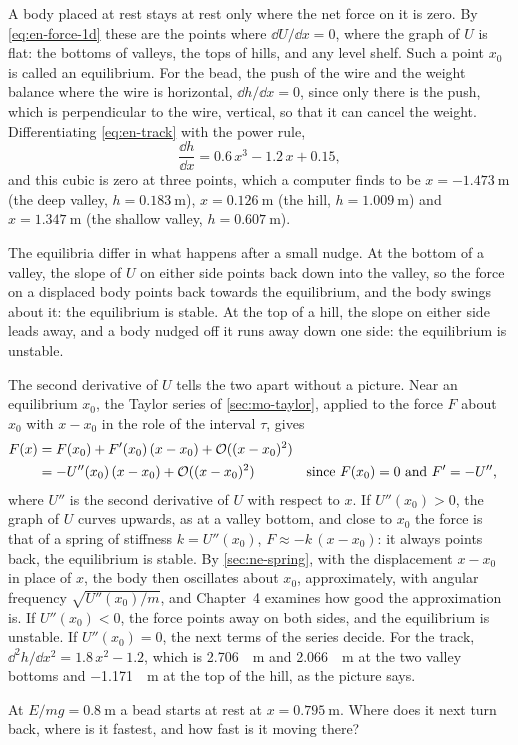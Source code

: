 A body placed at rest stays at rest only where the net force on it is
zero. By
\cref{eq:en-force-1d} these are the points where $\dd U/\dd x = 0$, where
the graph of $U$ is flat: the bottoms of valleys, the tops of hills, and
any level shelf. Such a point $x_0$ is called an equilibrium. For the
bead, the push of the wire and the weight balance where the wire is
horizontal, $\dd h/\dd x = 0$, since only there is the push, which is
perpendicular to the wire, vertical, so that it can cancel the weight. Differentiating \cref{eq:en-track} with the
power rule,
\begin{equation*}
   \frac{\dd h}{\dd x} = 0.6\,x^3 - 1.2\,x + 0.15 ,
\end{equation*}
and this cubic is zero at three points, which a computer finds to be $x =
\SI{-1.473}{\metre}$ (the deep valley, $h = \SI{0.183}{\metre}$), $x =
\SI{0.126}{\metre}$ (the hill, $h = \SI{1.009}{\metre}$) and $x =
\SI{1.347}{\metre}$ (the shallow valley, $h = \SI{0.607}{\metre}$).

The equilibria differ in what happens after a small nudge. At the bottom
of a valley, the slope of $U$ on either side points back down into the
valley, so the force on a displaced body points back towards the
equilibrium, and the body swings about it: the equilibrium is stable. At
the top of a hill, the slope on either side leads away, and a body nudged
off it runs away down one side: the equilibrium is unstable.

The second derivative of $U$ tells the two apart without a picture. Near
an equilibrium $x_0$, the Taylor series of \cref{sec:mo-taylor}, applied
to the force $F$ about $x_0$ with $x - x_0$ in the role of the interval
$\tau$, gives
\begin{align*}
   F(x) &= F(x_0) + F'(x_0)\,(x - x_0) + \mathcal{O}((x - x_0)^2)\\
   &= -U''(x_0)\,(x - x_0) + \mathcal{O}((x - x_0)^2)
      && \text{since $F(x_0) = 0$ and $F' = -U''$,}
\end{align*}
where $U''$ is the second derivative of $U$ with respect to $x$. If
$U''(x_0) > 0$, the graph of $U$ curves upwards, as at a valley bottom,
and close to $x_0$ the force is that of a spring of stiffness $k =
U''(x_0)$, $F \approx -k\,(x - x_0)$: it always points back, the
equilibrium is stable. By \cref{sec:ne-spring}, with the displacement
$x - x_0$ in place of $x$, the body then oscillates about $x_0$,
approximately, with angular frequency $\sqrt{U''(x_0)/m}$,
and Chapter~4 examines how good the approximation is. If $U''(x_0) <
0$, the force points away on both sides, and the equilibrium is unstable.
If $U''(x_0) = 0$, the next terms of the series decide. For the track,
$\dd^2 h/\dd x^2 = 1.8\,x^2 - 1.2$, which is \SI{+2.706}{\per\metre} and
\SI{+2.066}{\per\metre} at the two valley bottoms and
\SI{-1.171}{\per\metre} at the top of the hill, as the picture says.


\begin{selfcheck}
At $E/mg = \SI{0.8}{\metre}$ a bead starts at rest at $x =
\SI{0.795}{\metre}$. Where does it next turn back, where is it fastest,
and how fast is it moving there?
\end{selfcheck}
